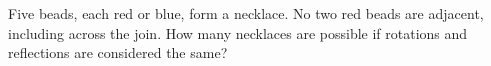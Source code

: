 Five beads, each red or blue, form a necklace. No two red beads are adjacent, including across the join. How many necklaces are possible if rotations and reflections are considered the same?
